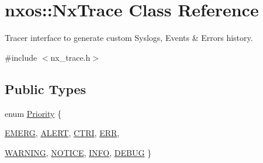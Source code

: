 \hypertarget{classnxos_1_1NxTrace}{
\section{nxos::NxTrace Class Reference}
\label{classnxos_1_1NxTrace}
}


Tracer interface to generate custom Syslogs, Events \& Errors history.  


{\ttfamily \#include $<$nx\_\-trace.h$>$}\subsection*{Public Types}
\begin{DoxyCompactItemize}
\item 
enum \hyperlink{classnxos_1_1NxTrace_a582f6e5a22e788c61807657f8bca088f}{Priority} \{ \par
\hyperlink{classnxos_1_1NxTrace_a582f6e5a22e788c61807657f8bca088fa162b57da846293468dd47af10c603df2}{EMERG}, 
\hyperlink{classnxos_1_1NxTrace_a582f6e5a22e788c61807657f8bca088fa8733d052a42f110d6638988de5b6e4e4}{ALERT}, 
\hyperlink{classnxos_1_1NxTrace_a582f6e5a22e788c61807657f8bca088fad47bf23377867d39c4d53d2b2689b4da}{CTRI}, 
\hyperlink{classnxos_1_1NxTrace_a582f6e5a22e788c61807657f8bca088faeac0f6db2341c975bf8e46d34496eb08}{ERR}, 
\par
\hyperlink{classnxos_1_1NxTrace_a582f6e5a22e788c61807657f8bca088fab187ad33eec7a961a9b1f3c787ecd003}{WARNING}, 
\hyperlink{classnxos_1_1NxTrace_a582f6e5a22e788c61807657f8bca088fac0c5faafc7a08a2bb2388c2d6c670936}{NOTICE}, 
\hyperlink{classnxos_1_1NxTrace_a582f6e5a22e788c61807657f8bca088fae821a1cd215dd3a51942abd8af16f36e}{INFO}, 
\hyperlink{classnxos_1_1NxTrace_a582f6e5a22e788c61807657f8bca088faa682e4987de0b7ca5b5474c68bbf9d4e}{DEBUG}
 \}
\end{DoxyCompactItemize}
